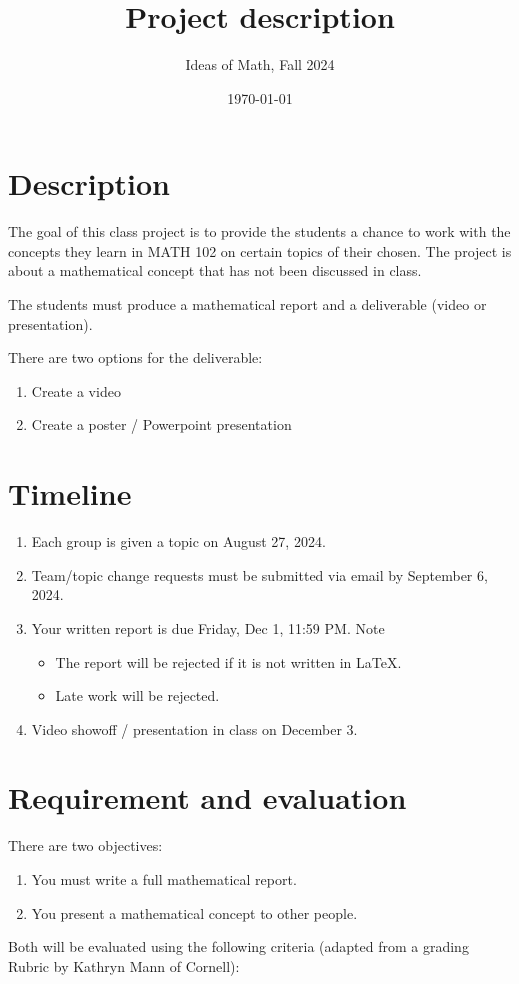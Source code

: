\documentclass[12pt]{amsart}
\title{ Project description }
\author{Ideas of Math, Fall 2024}
\date{\today}
\begin{document}
\maketitle


\section{Description}
The goal of this class project is to provide the students a chance to work with
the concepts they learn in MATH 102 on certain topics of their chosen.
The project is about a mathematical concept that has not been discussed in class.

The students must produce a mathematical report and a deliverable (video or presentation).

There are two options for the deliverable:
\begin{enumerate}
	\item Create a video
	\item Create a poster / Powerpoint presentation
\end{enumerate}

\section{Timeline}
\begin{enumerate}
	\item Each group is given a topic on August 27, 2024.
	\item Team/topic change requests must be submitted via email by September 6, 2024.
	\item Your written report is due Friday, Dec 1, 11:59 PM. Note
	      \begin{itemize}
		      \item The report will be rejected if it is not written in LaTeX.
		      \item Late work will be rejected.
	      \end{itemize}
	\item Video showoff / presentation in class on December 3.
\end{enumerate}

\section{Requirement and evaluation}
There are two objectives:
\begin{enumerate}
	\item You must write a full mathematical report.
	\item You present a mathematical concept to other people.
\end{enumerate}
Both will be evaluated using the following criteria (adapted from a grading Rubric
by Kathryn Mann of Cornell):
\end{document}
